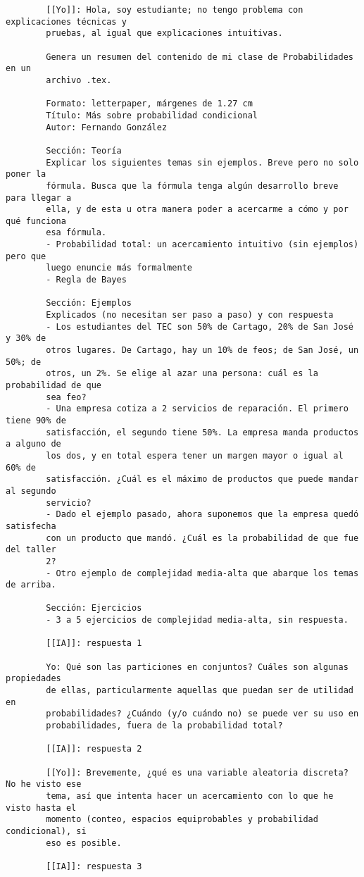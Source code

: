 \documentclass[letterpaper, 12pt]{article}
\begin{document}
	\begin{verbatim}
		[[Yo]]: Hola, soy estudiante; no tengo problema con explicaciones técnicas y
		pruebas, al igual que explicaciones intuitivas.
		
		Genera un resumen del contenido de mi clase de Probabilidades en un
		archivo .tex.
		
		Formato: letterpaper, márgenes de 1.27 cm
		Título: Más sobre probabilidad condicional
		Autor: Fernando González
		
		Sección: Teoría
		Explicar los siguientes temas sin ejemplos. Breve pero no solo poner la
		fórmula. Busca que la fórmula tenga algún desarrollo breve para llegar a
		ella, y de esta u otra manera poder a acercarme a cómo y por qué funciona
		esa fórmula.
		- Probabilidad total: un acercamiento intuitivo (sin ejemplos) pero que
		luego enuncie más formalmente
		- Regla de Bayes
		
		Sección: Ejemplos
		Explicados (no necesitan ser paso a paso) y con respuesta
		- Los estudiantes del TEC son 50% de Cartago, 20% de San José y 30% de
		otros lugares. De Cartago, hay un 10% de feos; de San José, un 50%; de
		otros, un 2%. Se elige al azar una persona: cuál es la probabilidad de que
		sea feo?
		- Una empresa cotiza a 2 servicios de reparación. El primero tiene 90% de
		satisfacción, el segundo tiene 50%. La empresa manda productos a alguno de
		los dos, y en total espera tener un margen mayor o igual al 60% de
		satisfacción. ¿Cuál es el máximo de productos que puede mandar al segundo
		servicio?
		- Dado el ejemplo pasado, ahora suponemos que la empresa quedó satisfecha
		con un producto que mandó. ¿Cuál es la probabilidad de que fue del taller
		2?
		- Otro ejemplo de complejidad media-alta que abarque los temas de arriba.
				
		Sección: Ejercicios
		- 3 a 5 ejercicios de complejidad media-alta, sin respuesta.
		
		[[IA]]: respuesta 1
		
		Yo: Qué son las particiones en conjuntos? Cuáles son algunas propiedades
		de ellas, particularmente aquellas que puedan ser de utilidad en
		probabilidades? ¿Cuándo (y/o cuándo no) se puede ver su uso en
		probabilidades, fuera de la probabilidad total?
		
		[[IA]]: respuesta 2
		
		[[Yo]]: Brevemente, ¿qué es una variable aleatoria discreta? No he visto ese
		tema, así que intenta hacer un acercamiento con lo que he visto hasta el
		momento (conteo, espacios equiprobables y probabilidad condicional), si
		eso es posible.
		
		[[IA]]: respuesta 3
	\end{verbatim}
	
\end{document}
